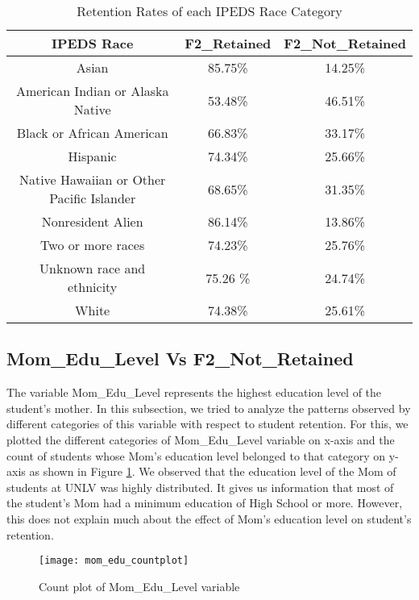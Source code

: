 \documentclass[11pt,openright]{report}
\begin{document}
 \begin{table}[!ht]
	\renewcommand{\arraystretch}{1.3}
	\caption{Retention Rates of each IPEDS Race Category}
	\label{table:ipeds_race_retentions}
	\centering
	\begin{tabular}{|c|c|c|}
		\hline
		\bfseries IPEDS Race & \bfseries F2\_Retained & \bfseries F2\_Not\_Retained\\
		\hline
		Asian & 85.75\% & 14.25\% \\ \hline
		American Indian or Alaska Native & 53.48\% & 46.51\% \\ \hline
		Black or African American & 66.83\% & 33.17\% \\ \hline
		Hispanic & 74.34\% & 25.66\% \\ \hline
		Native Hawaiian or Other Pacific Islander & 68.65\% & 31.35\% \\ \hline
		Nonresident Alien & 86.14\% & 13.86\% \\ \hline
		Two or more races &  74.23\% &  25.76\% \\ \hline
		Unknown race and ethnicity & 75.26 \% & 24.74\% \\ \hline
		White & 74.38\% & 25.61\% \\ \hline
	\end{tabular}
\end{table}



\subsection {Mom\_Edu\_Level	 Vs F2\_Not\_Retained}
The variable Mom\_Edu\_Level represents the highest education level of the student's mother. In this subsection, we tried to analyze the patterns observed by different categories of this variable with respect to student retention. For this, we plotted the different categories of Mom\_Edu\_Level variable on x-axis and the count of students whose Mom's education level belonged to that category on y-axis as shown in Figure \ref{fig:mom_edu_F2NotRetained_plot}. We observed that the education level of the Mom of students at UNLV was highly distributed. It gives us information that most of the student's Mom had a minimum education of High School or more. However, this does not explain much about the effect of Mom's education level on student's retention.

\begin{figure}[!ht]
	\centering
	\texttt{[image: mom\_edu\_countplot]}
	\caption{Count plot of Mom\_Edu\_Level variable}
	\label{fig:mom_edu_F2NotRetained_plot}
\end{figure}
\end{document}
